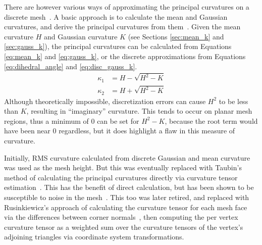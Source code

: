 There are however various ways of approximating the principal curvatures on a discrete mesh~\cite{EstCurvOnTriMesh, DiscDiffGeoOpsTriMani}.
A basic approach is to calculate the mean and Gaussian curvatures, and derive the principal curvatures from them~\cite{DDGAppIntro_19_discrete_k_2, Gauss_mean_k_notes}.
Given the mean curvature $H$ and Gaussian curvature $K$ (see Sections \ref{sec:mean_k} and \ref{sec:gauss_k}), the principal curvatures can be calculated from Equations \ref{eq:mean_k} and \ref{eq:gauss_k}, or the discrete approximations from Equations \ref{eq:dihedral_angle} and \ref{eq:disc_gauss_k}.
\begin{align*}
	\kappa_1 &= H - \sqrt{H^2 - K} \\
	\kappa_2 &= H + \sqrt{H^2 - K}
\end{align*}
Although theoretically impossible, discretization errors can cause $H^2$ to be less than $K$, resulting in ``imaginary'' curvature.
This tends to occur on planar mesh regions, thus a minimum of 0 can be set for $H^2 - K$, because the root term would have been near 0 regardless, but it does highlight a flaw in this measure of curvature.

Initially, RMS curvature calculated from discrete Gaussian and mean curvature was used as the mesh height.
But this was eventually replaced with Taubin's method of calculating the principal curvatures directly via curvature tensor estimation~\cite{TaubinTensor}.
This has the benefit of direct calculation, but has been shown to be susceptible to noise in the mesh~\cite{Comp_k_notes}.
This too was later retired, and replaced with Rusinkiewicz's approach of calculating the curvature tensor for each mesh face via the differences between corner normals~\cite{SRTensor}, then computing the per vertex curvature tensor as a weighted sum over the curvature tensors of the vertex's adjoining triangles via coordinate system transformations.


